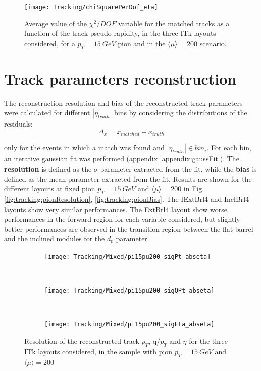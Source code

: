 \documentclass[a4paper,twoside,12pt]{book}
\begin{document}
\begin{figure}
\centering
\texttt{[image: Tracking/chiSquarePerDof\_eta]}
\caption{Average value of the $\chi^{2}/DOF$ variable for the matched tracks as a function of the track pseudo-rapidity, in the three ITk layouts considered, for a $p_{T} = 15\ GeV$ pion
and in the $\langle\mu\rangle = 200$ scenario.}
\label{fig:tracking:chiSqPerDof_eta}
\end{figure}

\section{Track parameters reconstruction}\label{sec:tracking:resolution}
The reconstruction resolution and bias of the reconstructed track parameters were calculated for different $|\eta_{truth}|$ bins by considering the distributions of the residuals:\\
$$
\Delta_{x} = x_{matched} - x_{truth}
$$

only for the events in which a match was found and $|\eta_{truth}| \in bin_{i}$. For each bin, an iterative gaussian fit was performed (appendix \ref{appendix:gaussFit}). The \textbf{resolution}
is defined as the $\sigma$ parameter extracted from the fit, while the \textbf{bias} is defined as the mean parameter extracted from the fit. Results are shown for the different layouts at
fixed pion $p_{T} = 15\ GeV$ and $\langle\mu\rangle = 200$ in Fig.\ref{fig:tracking:pionResolution}, \ref{fig:tracking:pionBias}. The IExtBrl4 and InclBrl4 layouts show very similar
performances. The ExtBrl4 layout show worse performances in the forward region for
each variable considered, but slightly better performances are observed in the transition
region between the flat barrel and the inclined modules for the $d_{0}$ parameter. \\

\begin{figure}
\begin{subfigure}{\linewidth}
\centering
\texttt{[image: Tracking/Mixed/pi15pu200\_sigPt\_abseta]}
\caption{}
\label{fig:tracking:pi15pu200_sigPt_abseta}
\end{subfigure}\\[1ex]
\begin{subfigure}{\linewidth}
\centering
\texttt{[image: Tracking/Mixed/pi15pu200\_sigQPt\_abseta]}
\caption{}
\label{fig:tracking:pi15pu200_sigQPt_abseta}
\end{subfigure}\\[1ex]
\begin{subfigure}{\linewidth}
\centering
\texttt{[image: Tracking/Mixed/pi15pu200\_sigEta\_abseta]}
\caption{}
\label{fig:tracking:pi15pu200_sigEta_abseta}
\end{subfigure}
\caption{Resolution of the reconstructed track $p_{T}$, q/$p_{T}$ and $\eta$ for the three ITk layouts considered, in the sample with pion $p_{T} = 15\ GeV$ and $\langle\mu\rangle = 200$}
\label{fig:tracking:pionResolution-1}
\end{figure}
\end{document}
